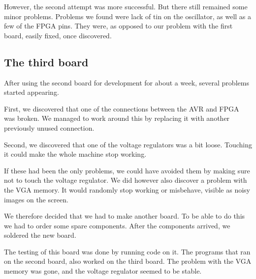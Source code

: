 However, the second attempt was more successful. But there still remained some
minor problems. Problems we found were lack of tin on the oscillator, as well as
a few of the \ac{FPGA} pins. They were, as opposed to our problem with the first
board, easily fixed, once discovered.

\subsection{The third board}
After using the second board for development for about a week, several problems started appearing.

First, we discovered that one of the connections between the AVR and FPGA was broken. We managed to work around this by replacing it with another previously unused connection.

Second, we discovered that one of the voltage regulators was a bit loose. Touching it could make the whole machine stop working.

If these had been the only problems, we could have avoided them by making sure not to touch the voltage regulator. We did however also discover a problem with the VGA memory. It would randomly stop working or misbehave, visible as noisy images on the screen.

We therefore decided that we had to make another board. To be able to do this we had to order some spare components. After the components arrived, we soldered the new board.

The testing of this board was done by running code on it. The programs that ran on the second board, also worked on the third board. The problem with the VGA memory was gone, and the voltage regulator seemed to be stable.

